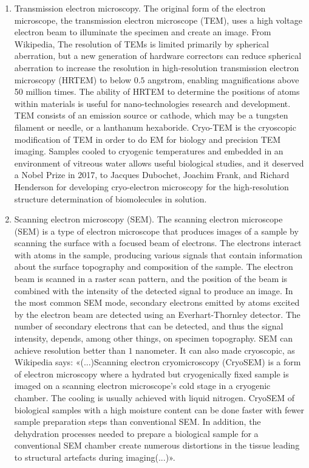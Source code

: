 	\begin{enumerate}
		\item Transmission electron microscopy. The original form of the electron microscope, the transmission electron microscope (TEM), uses a high voltage electron beam to illuminate the specimen and create an image. From Wikipedia, The resolution of TEMs is limited primarily by spherical aberration, but a new generation of hardware correctors can reduce spherical aberration to increase the resolution in high-resolution transmission electron microscopy (HRTEM) to below $0.5$ angstrom, enabling magnifications above 50 million times. The ability of HRTEM to determine the positions of atoms within materials is useful for nano-technologies research and development. TEM consists of an emission source or cathode, which may be a tungsten filament or needle, or a lanthanum hexaboride. Cryo-TEM is the cryoscopic modification of TEM in order to do EM for biology and precision TEM imaging. Samples cooled to cryogenic temperatures and embedded in an environment of vitreous water allows useful biological studies, and it deserved a Nobel Prize in 2017, to Jacques Dubochet, Joachim Frank, and Richard Henderson for developing cryo-electron microscopy for the high-resolution structure determination of biomolecules in solution.
		
		\item Scanning electron microscopy (SEM). The scanning electron microscope (SEM) is a type of electron microscope that produces images of a sample by scanning the surface with a focused beam of electrons. The electrons interact with atoms in the sample, producing various signals that contain information about the surface topography and composition of the sample. The electron beam is scanned in a raster scan pattern, and the position of the beam is combined with the intensity of the detected signal to produce an image. In the most common SEM mode, secondary electrons emitted by atoms excited by the electron beam are detected using an Everhart-Thornley detector. The number of secondary electrons that can be detected, and thus the signal intensity, depends, among other things, on specimen topography. SEM can achieve resolution better than $1$ nanometer. It can also made cryoscopic, as Wikipedia says: «(...)Scanning electron cryomicroscopy (CryoSEM) is a form of electron microscopy where a hydrated but cryogenically fixed sample is imaged on a scanning electron microscope's cold stage in a cryogenic chamber. The cooling is usually achieved with liquid nitrogen. CryoSEM of biological samples with a high moisture content can be done faster with fewer sample preparation steps than conventional SEM. In addition, the dehydration processes needed to prepare a biological sample for a conventional SEM chamber create numerous distortions in the tissue leading to structural artefacts during imaging(...)».
		

\end{enumerate}
